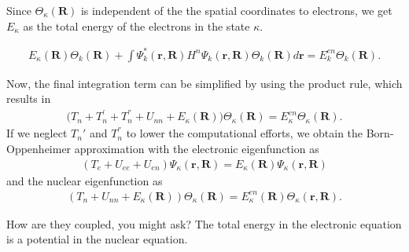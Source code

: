 Since $\Theta_\kappa(\textbf{R})$ is independent of the the spatial coordinates to electrons, we get $E_{\kappa}$ as the total energy of the electrons in the state $\kappa$.

\begin{align}
     E_\kappa(\textbf{R}) \Theta_k(\textbf{R}) + \int \Psi_k^*(\textbf{r},\textbf{R})H^n\Psi_k(\textbf{r},\textbf{R})\Theta_k(\textbf{R})d\textbf{r} = E_k^{en} \Theta_k(\textbf{R}).
\end{align}

Now, the final integration term can be simplified by using the product rule, which results in
\begin{align}
    \Big( T_n+T_n^{'} + T_n^{''} +U_{nn} + E_\kappa(\textbf{R}) \Big)\Theta_\kappa(\textbf{R}) = E_\kappa^{en}\Theta_\kappa (\textbf{R}).
\end{align}
If we neglect $T_n'$ and $T_n^{''}$ to lower the computational efforts, we obtain the Born-Oppenheimer approximation with the electronic eigenfunction as
\begin{align}
    \left( T_e + U_{ee} + U_{en} \right) \Psi_\kappa (\textbf{r},\textbf{R}) = E_{\kappa}(\textbf{R})\Psi_\kappa(\textbf{r},\textbf{R})
\end{align}
and the nuclear eigenfunction as
\begin{align}
    \left(T_n + U_{nn} + E_\kappa (\textbf{R}) \right) \Theta_\kappa(\textbf{R})= E_{\kappa}^{en}(\textbf{R})\Theta_\kappa(\textbf{r},\textbf{R}).
\end{align}

How are they coupled, you might ask? The total energy in the electronic equation is a potential in the nuclear equation.

